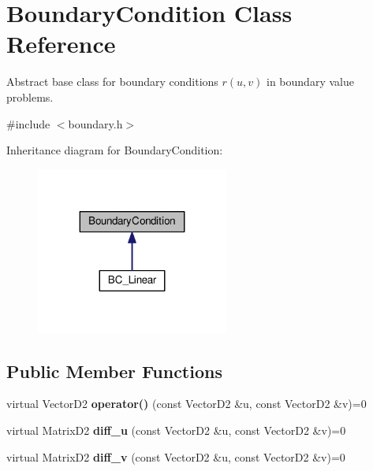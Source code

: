 \hypertarget{classBoundaryCondition}{}\section{Boundary\+Condition Class Reference}
\label{classBoundaryCondition}


Abstract base class for boundary conditions $r(u,v)$ in boundary value problems.  




{\ttfamily \#include $<$boundary.\+h$>$}



Inheritance diagram for Boundary\+Condition\+:\nopagebreak
\begin{figure}[H]
\begin{center}
\leavevmode
\includegraphics[width=179pt]{classBoundaryCondition__inherit__graph}
\end{center}
\end{figure}
\subsection*{Public Member Functions}
\begin{DoxyCompactItemize}
\item 
\mbox{\label{classBoundaryCondition_aca60bc8b1f7d06912f82680479bd1d08}} 
virtual Vector\+D2 {\bfseries operator()} (const Vector\+D2 \&u, const Vector\+D2 \&v)=0
\item 
\mbox{\label{classBoundaryCondition_ac228bf957db9c75942e824d33ffce226}} 
virtual Matrix\+D2 {\bfseries diff\+\_\+u} (const Vector\+D2 \&u, const Vector\+D2 \&v)=0
\item 
\mbox{\label{classBoundaryCondition_aea4dd11efed142ce9bfc5ba71c15a1c7}} 
virtual Matrix\+D2 {\bfseries diff\+\_\+v} (const Vector\+D2 \&u, const Vector\+D2 \&v)=0
\end{DoxyCompactItemize}


